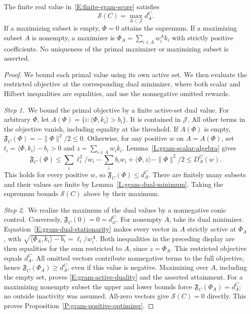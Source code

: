 \begin{proposition}\label{P:gram-positive-optimizer}
  The finite real value in~\eqref{E:finite-gram-score} satisfies
  \begin{equation}\label{E:gram-active-duality}
    \mathscr{S}(C)=\max_{A\subset\mathcal{J}}d_A^C .
  \end{equation}
  If a maximizing subset is empty, $\Phi = 0$ attains the supremum. If a
  maximizing subset $A$ is nonempty, a maximizer is $\Phi_A = \sum_{i\in A}w_i^A
  k_i$ with strictly positive coefficients. No uniqueness of the primal
  maximizer or maximizing subset is asserted.
\end{proposition}

\begin{proof}
  We bound each primal value using its own active set. We then evaluate the
  restricted objective at the corresponding dual minimizer, where both scalar
  and Hilbert inequalities are equalities, and use the nonnegative omitted
  rewards.


  \medskip
  \noindent\textit{Step 1.~}We bound the primal objective by a finite
  active-set dual value.
  For arbitrary $\Phi$, let $A(\Phi) = \{i:\langle\Phi,k_i\rangle>b_i\}$. It is
  contained in $\mathcal{J}$. All other terms in the objective vanish, including
  equality at the threshold. If $A(\Phi)$ is empty, $\mathfrak{F}_C(\Phi) =
  -\|\Phi\|^2/2 \le 0$. Otherwise, for any positive $w$ on $A = A(\Phi)$, set
  $t_i = \langle\Phi,k_i\rangle-b_i > 0$ and $z = \sum_{i\in A}w_ik_i$.
  Lemma~\ref{L:gram-scalar-algebra} gives
  \[
    \mathfrak{F}_C(\Phi)
    \le\sum_i\ell_i^2/w_i-\sum_i b_iw_i
    +\langle\Phi,z\rangle-\|\Phi\|^2/2
    \le D_A^C(w).
  \]
  This holds for every positive $w$, so $\mathfrak{F}_C(\Phi) \le d_A^C$. There
  are finitely many subsets and their values are finite by
  Lemma~\ref{L:gram-dual-minimum}. Taking the supremum bounds $\mathscr{S}(C)$
  above by their maximum.


  \medskip
  \noindent\textit{Step 2.~}We realize the maximum of the dual values by a
  nonnegative conic control.
  Conversely, $\mathfrak{F}_C(0) = 0 = d_\varnothing^C$. For nonempty $A$, take
  its dual minimizer. Equation~\eqref{E:gram-dual-stationarity} makes every
  vector in $A$ strictly active at $\Phi_A$, with
  $\sqrt{\langle\Phi_A,k_i\rangle-b_i} = \ell_i/w_i^A$. Both inequalities in the
  preceding display are then equalities for the sum restricted to $A$, since $z
  = \Phi_A$. This restricted objective equals $d_A^C$. All omitted vectors
  contribute nonnegative terms to the full objective, hence
  $\mathfrak{F}_C(\Phi_A) \ge d_A^C$, even if this value is negative. Maximizing
  over $A$, including the empty set, proves \eqref{E:gram-active-duality} and
  the asserted attainment. For a maximizing nonempty subset the upper and lower
  bounds force $\mathfrak{F}_C(\Phi_A) = d_A^C$; no outside inactivity was
  assumed. All-zero vectors give $\mathscr{S}(C) = 0$ directly. This proves
  Proposition~\ref{P:gram-positive-optimizer}.
\end{proof}

